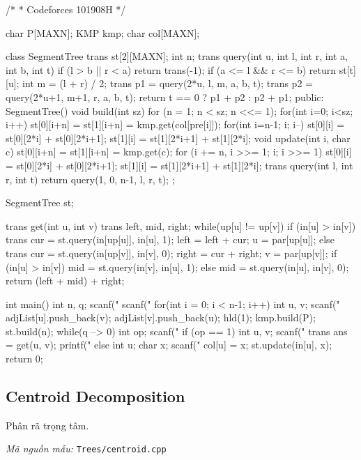 \documentclass[11pt]{article}
\newcommand{\codepath}[1]{\par\noindent\textit{Mã nguồn mẫu:} \texttt{#1}\par}
\begin{document}
\begin{vncode}
/*
 * Codeforces 101908H
 */

char P[MAXN];
KMP kmp;
char col[MAXN];

class SegmentTree {
	trans st[2][MAXN];
	int n;
	trans query(int u, int l, int r, int a, int b, int t) {
		if (l > b || r < a) return trans(-1);
		if (a <= l && r <= b) return st[t][u];
		int m = (l + r) / 2;
		trans p1 = query(2*u, l, m, a, b, t);
		trans p2 = query(2*u+1, m+1, r, a, b, t);
		return t == 0 ? p1 + p2 : p2 + p1;
	}
public:
	SegmentTree() {}
	void build(int sz) {
		for (n = 1; n < sz; n <<= 1);
		for(int i=0; i<sz; i++) {
			st[0][i+n] = st[1][i+n] = kmp.get(col[pre[i]]);
		}
		for(int i=n-1; i; i--) {
			st[0][i] = st[0][2*i] + st[0][2*i+1];
			st[1][i] = st[1][2*i+1] + st[1][2*i];
		}
	}
	void update(int i, char c) {
		st[0][i+n] = st[1][i+n] = kmp.get(c);
		for (i += n, i >>= 1; i; i >>= 1) {
			st[0][i] = st[0][2*i] + st[0][2*i+1];
			st[1][i] = st[1][2*i+1] + st[1][2*i];
		}
	}
	trans query(int l, int r, int t) {
		return query(1, 0, n-1, l, r, t);
	}
};

SegmentTree st;

trans get(int u, int v) {
	trans left, mid, right;
	while(up[u] != up[v]) {
		if (in[u] > in[v]) {
			trans cur = st.query(in[up[u]], in[u], 1);
			left = left + cur;
			u = par[up[u]];
		}
		else {
			trans cur = st.query(in[up[v]], in[v], 0);
			right = cur + right;
			v = par[up[v]];
		}
	}
	if (in[u] > in[v]) mid = st.query(in[v], in[u], 1);
	else mid = st.query(in[u], in[v], 0);
	return (left + mid) + right;
}

int main() {
	int n, q;
	scanf("%
	scanf(" %
	for(int i = 0; i < n-1; i++) {
		int u, v;
		scanf("%
		adjList[u].push_back(v);
		adjList[v].push_back(u);
	}
	hld(1);
	kmp.build(P);
	st.build(n);
	while(q --> 0) {
		int op;
		scanf("%
		if (op == 1) {
			int u, v;
			scanf("%
			trans ans = get(u, v);
			printf("%
		}
		else {
			int u;
			char x;
			scanf("%
			col[u] = x;
			st.update(in[u], x);
		}
	}
	return 0;
}
\end{vncode}
\endgroup


\subsection{Centroid Decomposition}

Phân rã trọng tâm.

\codepath{Trees/centroid.cpp}
\end{document}
